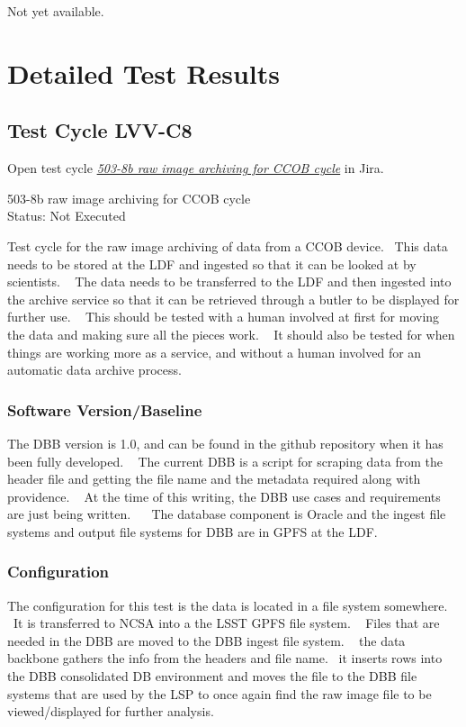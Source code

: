 \documentclass[DM,lsstdraft,STR,toc]{lsstdoc}
\begin{document}
Not yet available.

\newpage
\section{Detailed Test Results}
\label{sect:detailedtestresults}


  \subsection{Test Cycle LVV-C8 }

Open test cycle {\it \href{https://jira.lsstcorp.org/secure/Tests.jspa#/testrun/LVV-C8}{503-8b raw image archiving for CCOB cycle}} in Jira.

  503-8b raw image archiving for CCOB cycle\\
  Status: Not Executed

  Test cycle for the raw image archiving of data from a CCOB device. ~This
data needs to be stored at the LDF and ingested so that it can be looked
at by scientists. ~ The data needs to be transferred to the LDF and then
ingested into the archive service so that it can be retrieved through a
butler to be displayed for further use. ~ This should be tested with a
human involved at first for moving the data and making sure all the
pieces work. ~ It should also be tested for when things are working more
as a service, and without a human involved for an automatic data archive
process. ~


  \subsubsection{Software Version/Baseline}
    The DBB version is 1.0, and can be found in the github repository when
it has been fully developed. ~ The current DBB is a script for scraping
data from the header file and getting the file name and the metadata
required along with providence. ~ At the time of this writing, the DBB
use cases and requirements are just being written. ~ ~The database
component is Oracle and the ingest file systems and output file systems
for DBB are in GPFS at the LDF.~~


  \subsubsection{Configuration}
    The configuration for this test is the data is located in a file system
somewhere. ~It is transferred to NCSA into a the LSST GPFS file system.
~ Files that are needed in the DBB are moved to the DBB ingest file
system. ~ the data backbone gathers the info from the headers and file
name. ~it inserts rows into the DBB consolidated DB environment and
moves the file to the DBB file systems that are used by the LSP to once
again find the raw image file to be viewed/displayed for further
analysis. ~
\end{document}
